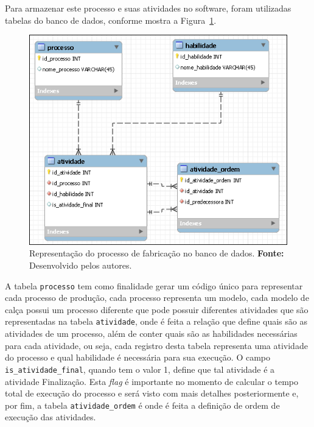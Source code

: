 \par Para armazenar este processo e suas atividades no software, foram utilizadas tabelas do banco de dados, conforme mostra 
a Figura~\ref{fig:proc_fabri_db}.

\newpage

\begin{figure}[h!]
	\centerline{\includegraphics[scale=0.7]{./imagens/representacao_processo.png}}
	\caption[Modelo do processo de fabricação no banco de dados.]
	{Representação do processo de fabricação no banco de dados. \textbf{Fonte:}
	Desenvolvido pelos autores.}
	\label{fig:proc_fabri_db}
\end{figure}

\par A tabela \texttt{processo} tem como finalidade gerar um código único para representar 
cada processo de produção, cada processo representa um modelo, cada modelo
de calça possui um processo diferente que pode possuir diferentes atividades que
são representadas na tabela \texttt{atividade}, onde é feita a relação que define quais são as atividades de 
um processo,  além de conter quais são as habilidades necessárias para cada atividade, ou seja, cada registro desta 
tabela representa uma atividade do processo e qual habilidade é necessária para sua execução. O campo 
\texttt{is\_atividade\_final}, quando tem o valor 1, define que tal atividade
é a atividade Finalização. Esta \textit{flag} é importante no momento de calcular o tempo total de execução do
processo e será visto com mais detalhes posteriormente e, por fim, a tabela
\texttt{atividade\_ordem} é onde é feita a definição de ordem de execução das
atividades.

